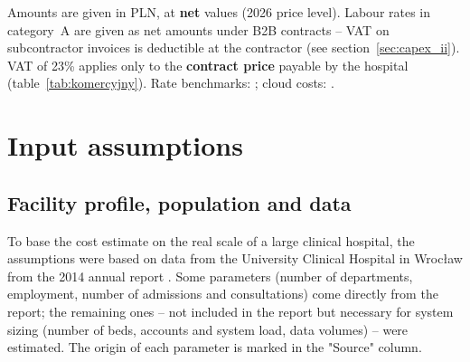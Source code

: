 Amounts are given in PLN, at \textbf{net} values (2026 price level). Labour rates in category~A are given as net amounts under B2B contracts -- VAT on subcontractor invoices is deductible at the contractor (see section~\ref{sec:capex_ii}). VAT of 23\% applies only to the \textbf{contract price} payable by the hospital (table~\ref{tab:komercyjny}). Rate benchmarks: \cite{Hays_2026, NoFluffJobs_2025}; cloud costs: \cite{Azure_Pricing_2026}.

\section{Input assumptions}

\subsection{Facility profile, population and data}

To base the cost estimate on the real scale of a large clinical hospital, the assumptions were based on data from the University Clinical Hospital in Wrocław from the 2014 annual report \cite{USK_Raport_2014}. Some parameters (number of departments, employment, number of admissions and consultations) come directly from the report; the remaining ones -- not included in the report but necessary for system sizing (number of beds, accounts and system load, data volumes) -- were estimated. The origin of each parameter is marked in the "Source" column.

